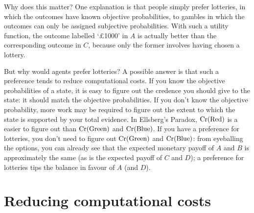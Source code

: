 Why does this matter? One explanation is that people simply prefer lotteries, in
which the outcomes have known objective probabilities, to gambles in which the
outcomes can only be assigned subjective probabilities. With such a utility
function, the outcome labelled `£1000' in $A$ is actually better than the
corresponding outcome in $C$, because only the former involves having chosen a
lottery.


But why would agents prefer lotteries? A possible answer is that such a
preference tends to reduce computational costs. If you know the objective
probabilities of a state, it is easy to figure out the credence you should give
to the state: it should match the objective probabilities. If you don't know the
objective probability, more work may be required to figure out the extent to
which the state is supported by your total evidence. In Ellsberg's Paradox,
$\text{Cr}(\text{Red})$ is a easier to figure out than $\text{Cr}(\text{Green})$ and
$\text{Cr}(\text{Blue})$. If you have a preference for lotteries, you don't need to
figure out $\text{Cr}(\text{Green})$ and $\text{Cr}(\text{Blue})$: from eyeballing the
options, you can already see that the expected monetary payoff of $A$ and $B$ is
approximately the same (as is the expected payoff of $C$ and $D$); a preference
for lotteries tips the balance in favour of $A$ (and $D$).


\section{Reducing computational costs}\label{sec:ai}

